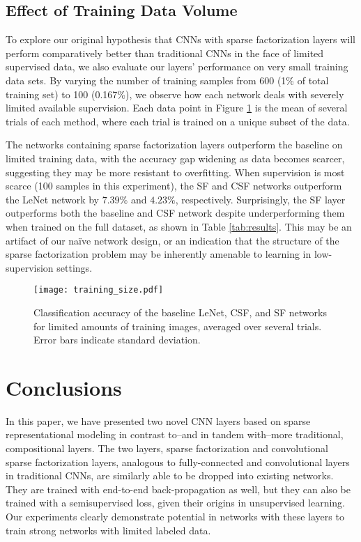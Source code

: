 \documentclass[10pt,twocolumn,letterpaper]{article}
\begin{document}
\subsection{Effect of Training Data Volume}

To explore our original hypothesis that CNNs with sparse factorization layers will perform comparatively better than traditional CNNs in the face of limited supervised data, we also evaluate our layers' performance on very small training data sets. By varying the number of training samples from 600 (1\% of total training set) to 100 (0.167\%), we observe how each network deals with severely limited available supervision. Each data point in Figure \ref{fig:trainsize} is the mean of several trials of each method, where each trial is trained on a unique subset of the data.

The networks containing sparse factorization layers outperform the baseline on limited training data, with the accuracy gap widening as data becomes scarcer, suggesting they may be more resistant to overfitting.  When supervision is most scarce (100 samples in this experiment), the SF and CSF networks outperform the LeNet network by $7.39\%$ and $4.23\%$, respectively. 
%
Surprisingly, the SF layer outperforms both the baseline and CSF network despite underperforming them when trained on the full dataset, as shown in Table \ref{tab:results}. This may be an artifact of our na{\"i}ve network design, or an indication that the structure of the sparse factorization problem may be inherently amenable to learning in low-supervision settings.

\begin{figure}[t]
	\begin{center}
		\texttt{[image: training\_size.pdf]}
	\end{center}
	\caption{Classification accuracy of the baseline LeNet, CSF, and SF networks for limited amounts of training images, averaged over several trials. Error bars indicate standard deviation.}
	\label{fig:trainsize}
\end{figure}

\section{Conclusions}
\label{sec:conclusion}
In this paper, we have presented two novel CNN layers based on sparse representational modeling in contrast to--and in tandem with--more traditional, compositional layers.  The two layers, sparse factorization and convolutional sparse factorization layers, analogous to fully-connected and convolutional layers in traditional CNNs, are similarly able to be dropped into existing networks.  They are trained with end-to-end back-propagation as well, but they can also be trained with a semisupervised loss, given their origins in unsupervised learning.  Our experiments clearly demonstrate potential in networks with these layers to train strong networks with limited labeled data.
\end{document}
